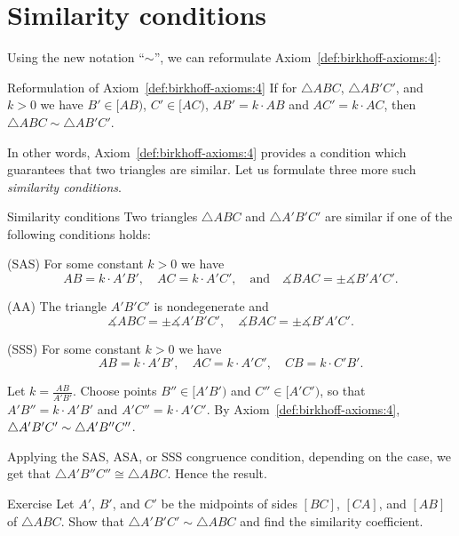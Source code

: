 \section{Similarity conditions}

Using the new notation ``$\sim$'', we can reformulate Axiom~\ref{def:birkhoff-axioms:4}:

\begin{thm}{Reformulation of Axiom~\ref{def:birkhoff-axioms:4}}
If for  
$\triangle ABC$, 
$\triangle AB'C'$,
and $k>0$ we have
$B'\in [AB)$,
$C'\in [AC)$,
$AB'=k\cdot AB$ and
$AC'=k\cdot AC$,
then $\triangle ABC\sim\triangle AB'C'$.
\end{thm}

In other words, Axiom~\ref{def:birkhoff-axioms:4} provides 
a condition which guarantees that two triangles are similar.
Let us formulate three more such {}\emph{similarity conditions}.

\begin{thm}{Similarity conditions}\label{prop:sim}
Two triangles 
$\triangle ABC$ and $\triangle A'B'C'$
are similar if one of the following conditions holds:

(SAS)
For some constant $k>0$ we have
\[A B=k\cdot A' B',
\quad 
A C=k\cdot A' C',
\quad
\text{and}
\quad 
\measuredangle B A C=\pm\measuredangle B' A' C'.\]

(AA) The triangle $A' B' C'$ is nondegenerate
and 
$$\measuredangle A B C
=
\pm\measuredangle A' B' C',
\quad 
\measuredangle B A C
=
\pm\measuredangle B' A' C'.$$

(SSS) For some constant $k>0$ we have
$$A B=k\cdot A' B',
\quad
A C=k\cdot A' C',
\quad
CB=k\cdot C'B'.$$

\end{thm}




Let $k=\tfrac{AB}{A'B'}$.
Choose points $B''\in [A'B')$ and $C''\in [A'C')$,
so that $A'B''=k\cdot A'B'$ and $A'C''=k\cdot A'C'$.
By Axiom~\ref{def:birkhoff-axioms:4},
$\triangle A'B'C'\z\sim \triangle A'B''C''$.

Applying the SAS, ASA, or SSS congruence condition, depending on the case, 
we get that $\triangle A'B''C''\cong \triangle ABC$.
Hence the result.
\qeds

\begin{thm}{Exercise}\label{ex:mid-triangle}
Let $A'$, $B'$, and $C'$ be the midpoints of sides $[BC]$, $[CA]$, and $[AB]$ of $\triangle ABC$.
Show that $\triangle A'B'C'\sim\triangle ABC$ and find the similarity coefficient.
\end{thm}


